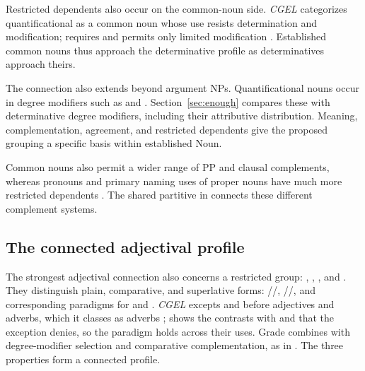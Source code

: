 \documentclass[12pt]{article}
\begin{document}
Restricted dependents also occur on the common-noun side. \textit{CGEL} categorizes quantificational  as a common noun whose use resists determination and modification;  requires  and permits only limited modification \citep[349--350]{huddleston2002}. Established common nouns thus approach the determinative profile as determinatives approach theirs.

The connection also extends beyond argument NPs. Quantificational nouns occur in degree modifiers such as  and  \citep[549--550]{huddleston2002}. Section~\ref{sec:enough} compares these with determinative degree modifiers, including their attributive distribution. Meaning, complementation, agreement, and restricted dependents give the proposed grouping a specific basis within established Noun.

Common nouns also permit a wider range of PP and clausal complements, whereas pronouns and primary naming uses of proper nouns have much more restricted dependents \citep[429--430, 439--443, 517--521]{huddleston2002}. The shared partitive in  connects these different complement systems.

\subsection{The connected adjectival profile}\label{sec:adjectival-profile}

The strongest adjectival connection also concerns a restricted group: , , , and . They distinguish plain, comparative, and superlative forms: /\allowbreak{}/\allowbreak{}, /\allowbreak{}/\allowbreak{}, and corresponding paradigms for  and  \citep[393--395]{huddleston2002}. \textit{CGEL} excepts  and  before adjectives and adverbs, which it classes as adverbs \citep[395, 1123]{huddleston2002}; \textcite{reynolds2024why} shows the contrasts with  and  that the exception denies, so the paradigm holds across their uses. Grade combines with degree-modifier selection and comparative complementation, as in . The three properties form a connected profile.
\end{document}
